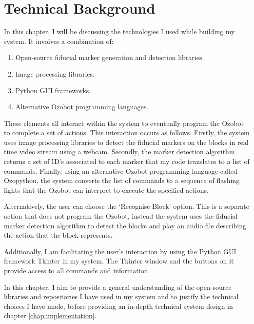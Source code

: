 \documentclass[oneside,%
                    author={Malak Hajji},
                    degree={BSc},
                    title={Designing An Accessible Ozobot Programming Platform for Students},
                  subtitle={With Mixed Visual Abilities}]{dissertation}
\begin{document}

\chapter{Technical Background}
\label{chap:technical}



\noindent
In this chapter, I will be discussing the technologies I used while building my system. It involves a combination of:

\begin{enumerate}
\item Open-source fiducial marker generation and detection libraries.
\item Image processing libraries.
\item Python GUI frameworks. 
\item Alternative Ozobot programming languages.
\end{enumerate}

\noindent
These elements all interact within the system to eventually program the Ozobot to complete a set of actions. This interaction occurs as follows.
Firstly, the system uses image processing libraries to detect the fiducial markers on the blocks in real time video stream using a webcam. Secondly, the marker detection algorithm returns a set of ID’s associated to each marker that my code translates to a list of commands. Finally, using an alternative Ozobot programming language called Ozopython, the system converts the list of commands to a sequence of flashing lights that the Ozobot can interpret to execute the specified actions. 

Alternatively, the user can choose the ‘Recognise Block’ option. This is a separate action that does not program the Ozobot, instead the system uses the fiducial marker detection algorithm to detect the blocks and play an audio file describing the action that the block represents. 

Additionally, I am facilitating the user’s interaction by using the Python GUI framework Tkinter in my system. The Tkinter window and the buttons on it provide access to all commands and information. 

In this chapter, I aim to provide a general understanding of the open-source libraries and repositories I have used in my system and to justify the technical choices I have made, before providing an in-depth technical system design in chapter \ref{chap:implementation}.
\end{document}
